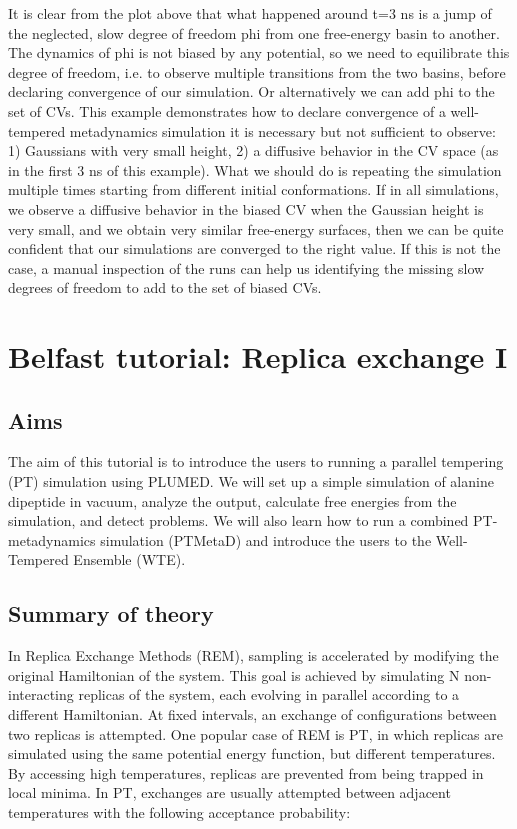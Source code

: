 \label{belfast-6_belfast-6-hidden-fig}%
\hypertarget{belfast-6_belfast-6-hidden-fig}{}%
 It is clear from the plot above that what happened around t=3 ns is a jump of the neglected, slow degree of freedom phi from one free-\/energy basin to another. The dynamics of phi is not biased by any potential, so we need to equilibrate this degree of freedom, i.\+e. to observe multiple transitions from the two basins, before declaring convergence of our simulation. Or alternatively we can add phi to the set of C\+Vs. This example demonstrates how to declare convergence of a well-\/tempered metadynamics simulation it is necessary but not sufficient to observe\+: 1) Gaussians with very small height, 2) a diffusive behavior in the C\+V space (as in the first 3 ns of this example). What we should do is repeating the simulation multiple times starting from different initial conformations. If in all simulations, we observe a diffusive behavior in the biased C\+V when the Gaussian height is very small, and we obtain very similar free-\/energy surfaces, then we can be quite confident that our simulations are converged to the right value. If this is not the case, a manual inspection of the runs can help us identifying the missing slow degrees of freedom to add to the set of biased C\+Vs. \hypertarget{belfast-7}{}\section{Belfast tutorial\+: Replica exchange I}\label{belfast-7}
\hypertarget{belfast-10_Aims}{}\subsection{Aims}\label{belfast-10_Aims}
The aim of this tutorial is to introduce the users to running a parallel tempering (P\+T) simulation using P\+L\+U\+M\+E\+D. We will set up a simple simulation of alanine dipeptide in vacuum, analyze the output, calculate free energies from the simulation, and detect problems. We will also learn how to run a combined P\+T-\/metadynamics simulation (P\+T\+Meta\+D) and introduce the users to the Well-\/\+Tempered Ensemble (W\+T\+E).\hypertarget{belfast-7_belfast-7-theory}{}\subsection{Summary of theory}\label{belfast-7_belfast-7-theory}
In Replica Exchange Methods \cite{sugi-okam99cpl} (R\+E\+M), sampling is accelerated by modifying the original Hamiltonian of the system. This goal is achieved by simulating N non-\/interacting replicas of the system, each evolving in parallel according to a different Hamiltonian. At fixed intervals, an exchange of configurations between two replicas is attempted. One popular case of R\+E\+M is P\+T, in which replicas are simulated using the same potential energy function, but different temperatures. By accessing high temperatures, replicas are prevented from being trapped in local minima. In P\+T, exchanges are usually attempted between adjacent temperatures with the following acceptance probability\+:

